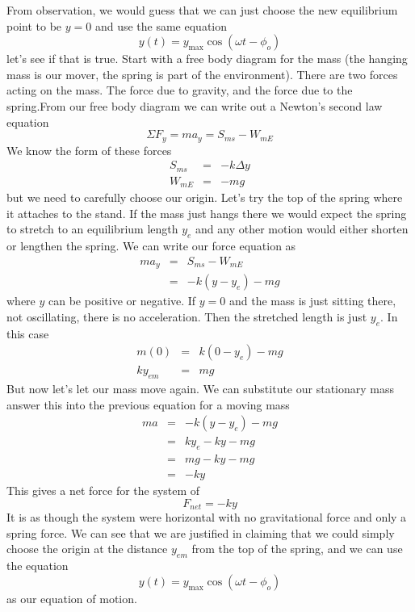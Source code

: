 \documentclass{book}
\begin{document}
From observation, we would guess that we can just choose the new equilibrium
point to be $y=0$ and use the same equation%
\begin{equation*}
y\left( t\right) =y_{\max }\cos (\omega t-\phi _{o})
\end{equation*}%
let's see if that is true. Start with a free body diagram for the mass (the
hanging mass is our mover, the spring is part of the environment). There are
two forces acting on the mass. The force due to gravity, and the force due
to the spring.From our free body diagram we can
write out a Newton's second law equation%
\begin{equation*}
\Sigma F_{y}=ma_{y}=S_{ms}-W_{mE}
\end{equation*}%
We know the form of these forces%
\begin{eqnarray*}
S_{ms} &=&-k\Delta y \\
W_{mE} &=&-mg
\end{eqnarray*}%
but we need to carefully choose our origin. Let's try the top of the spring
where it attaches to the stand. If the mass just hangs there we would expect
the spring to stretch to an equilibrium length $y_{e}$ and any other motion
would either shorten or lengthen the spring. We can write our force equation
as 
\begin{eqnarray*}
ma_{y} &=&S_{ms}-W_{mE} \\
&=&-k\left( y-y_{e}\right) -mg
\end{eqnarray*}%
where $y$ can be positive or negative. If $y=0$ and the mass is just sitting
there, not oscillating, there is no acceleration. Then the stretched length
is just $y_{e}.$ In this case%
\begin{eqnarray*}
m\left( 0\right) &=&k\left( 0-y_{e}\right) -mg \\
ky_{em} &=&mg
\end{eqnarray*}%
But now let's let our mass move again. We can substitute our stationary mass
answer this into the previous equation for a moving mass%
\begin{eqnarray*}
ma &=&-k\left( y-y_{e}\right) -mg \\
&=&ky_{e}-ky-mg \\
&=&mg-ky-mg \\
&=&-ky
\end{eqnarray*}%
This gives a net force for the system of 
\begin{equation*}
F_{net}=-ky
\end{equation*}%
It is as though the system were horizontal with no gravitational force and
only a spring force. We can see that we are justified in claiming that we
could simply choose the origin at the distance $y_{em}$ from the top of the
spring, and we can use the equation 
\begin{equation*}
y\left( t\right) =y_{\max }\cos (\omega t-\phi _{o})
\end{equation*}%
as our equation of motion.
\end{document}
